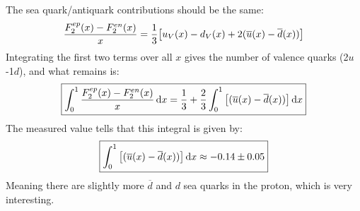 \documentclass[12pt]{article}
\renewcommand{\bar}{\overline}
\begin{document}
The sea quark/antiquark contributions should be the same:
\begin{align*}
  \frac{F^{ep}_2(x)-F^{en}_2(x)}{x}=
  \frac13\qty[u_V(x)-d_V(x)+2(\bar{u}(x)-\bar{d}(x))]
\end{align*}
Integrating the first two terms over all $x$ gives the number of valence quarks (2$u$-1$d$), and what remains is:
\begin{equation}
  \label{eq:p7b}
  \boxed{
    \int_0^1\frac{F^{ep}_2(x)-F^{en}_2(x)}{x}\dd{x}=
    \frac13+\frac23\int_0^1\qty[(\bar{u}(x)-\bar{d}(x))]\dd{x}
  }
\end{equation}
The measured value tells that this integral is given by:
\begin{equation}
  \label{eq:p7c}
  \boxed{\int_0^1\qty[(\bar{u}(x)-\bar{d}(x))]\dd{x}\approx
    -0.14\pm0.05}
\end{equation}
Meaning there are slightly more $\bar{d}$ and $d$ sea quarks in the proton, which is very interesting.
\end{document}
